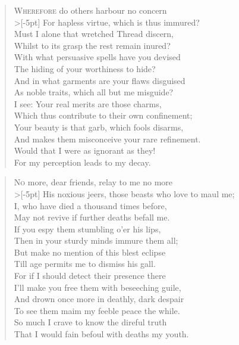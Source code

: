 \documentclass[a5paper, oneside]{memoir}
\begin{document}
\PoemTitle{}
\begin{verse}
    \lettrine{W}{herefore} do others harbour no concern \\>[-5pt]
    For hapless virtue, which is thus immured? \\
    Must I alone that wretched Thread discern, \\
    Whilst to its grasp the rest remain inured? \\
    With what persuasive spells have you devised \\
    The hiding of your worthiness to hide? \\
    And in what garments are your flaws disguised \\
    As noble traits, which all but me misguide? \\
    I see: Your real merits are those charms, \\
    Which thus contribute to their own confinement; \\
    Your beauty is that garb, which fools disarms, \\
    And makes them misconceive your rare refinement. \\
    \vin Would that I were as ignorant as they! \\
    \vin For my perception leads to my decay.
\end{verse}

\PoemTitle{}
\begin{verse}
    \lettrine{N}{o} more, dear friends, relay to me no more \\>[-5pt]
    His noxious jeers, those beasts who love to maul me; \\
    I, who have died a thousand times before, \\
    May not revive if further deaths befall me. \\ 
    If you espy them stumbling o'er his lips, \\
    Then in your sturdy minds immure them all; \\
    But make no mention of this blest eclipse \\
    Till age permits me to dismiss his gall. \\
    For if I should detect their presence there \\
    I'll make you free them with beseeching guile, \\
    And drown once more in deathly, dark despair \\
    To see them maim my feeble peace the while. \\
    \vin So much I crave to know the direful truth \\
    \vin That I would fain befoul with deaths my youth.
\end{verse}
\end{document}

